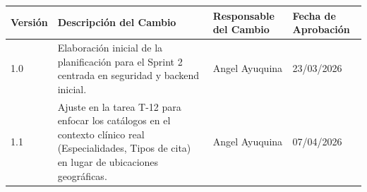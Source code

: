 \documentclass[a4paper,12pt]{article}
\renewcommand{\arraystretch}{1.1}
\begin{document}
\small
\renewcommand{\arraystretch}{1.25}
\begin{tabularx}{\textwidth}{|p{}|X|p{}|p{}|}
\hline
\textbf{Versión} & \textbf{Descripción del Cambio} & \textbf{Responsable del Cambio} & \textbf{Fecha de Aprobación} \\
\hline
1.0 & Elaboración inicial de la planificación para el Sprint 2 centrada en seguridad y backend inicial. & Angel Ayuquina & 23/03/2026 \\
\hline
1.1 & Ajuste en la tarea T-12 para enfocar los catálogos en el contexto clínico real (Especialidades, Tipos de cita) en lugar de ubicaciones geográficas. & Angel Ayuquina & 07/04/2026 \\
\hline
\end{tabularx}
\normalsize
\end{document}
